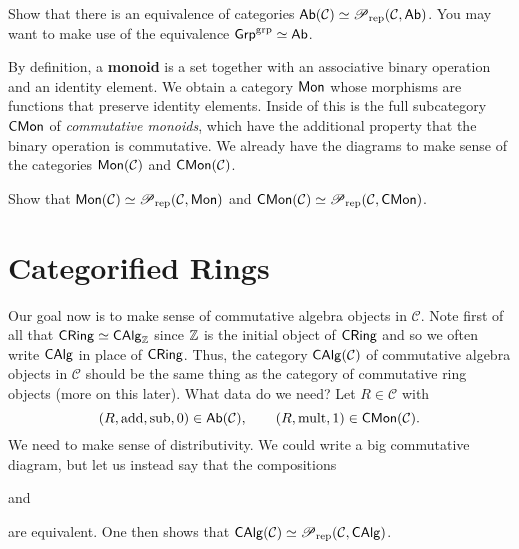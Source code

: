 \documentclass[11pt]{article}
\renewcommand{\C}{\mathcal{C}}
\DeclareMathOperator{\add}{add} %
\DeclareMathOperator{\mult}{mult} %
\DeclareMathOperator{\sub}{sub} %
\begin{document}
\begin{exercise}
Show that there is an equivalence of categories $\Ab(\C)\simeq\Pre_{\rep}(\C,\Ab)$. You may want to make use of the equivalence $\operatorname{\mathsf{Grp}}^{\operatorname{grp}}\simeq\operatorname{\mathsf{Ab}}$.
\end{exercise}

By definition, a \textbf{monoid} is a set together with an associative binary operation and an identity element. We obtain a category $\operatorname{\mathsf{Mon}}$ whose morphisms are functions that preserve identity elements. Inside of this is the full subcategory $\operatorname{\mathsf{CMon}}$ of \emph{commutative monoids}, which have the additional property that the binary operation is commutative. We already have the diagrams to make sense of the categories $\Mon(\C)$ and $\CMon(\C)$. 

\begin{exercise}
Show that $\Mon(\C)\simeq\Pre_{\rep}(\C,\Mon)$ and $\CMon(\C)\simeq\Pre_{\rep}(\C,\CMon)$.
\end{exercise}

\section{Categorified Rings}
Our goal now is to make sense of commutative algebra objects in $\C$. Note first of all that $\operatorname{\mathsf{CRing}}\simeq\operatorname{\mathsf{CAlg}}_{\mathbb{Z}}$ since $\mathbb{Z}$ is the initial object of $\operatorname{\mathsf{CRing}}$ and so we often write $\operatorname{\mathsf{CAlg}}$ in place of $\operatorname{\mathsf{CRing}}$. Thus, the category $\CAlg(\C)$ of commutative algebra objects in $\C$ should be the same thing as the category of commutative ring objects (more on this later). What data do we need? Let $R\in\C$ with 
$$(R,\add,\sub,0)\in\Ab(\C),\qquad (R,\mult,1)\in\CMon(\C).$$
We need to make sense of distributivity. We could write a big commutative diagram, but let us instead say that the compositions
\begin{center}
\end{center}
and
\begin{center}
\end{center}
are equivalent. One then shows that $\CAlg(\C)\simeq\Pre_{\rep}(\C,\CAlg)$.
\end{document}
